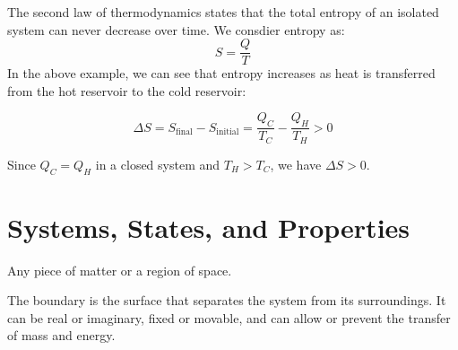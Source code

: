 \documentclass[11pt]{report}
\begin{document}
\begin{definition}
    The second law of thermodynamics states that the total entropy of an isolated system can never decrease over time. We consdier entropy as:
    \begin{equation}
        S = \frac{Q}{T}
    \end{equation}
    In the above example, we can see that entropy increases as heat is transferred from the hot reservoir to the cold reservoir:

    \begin{equation}
        \Delta S = S_{\text{final}} - S_{\text{initial}} = \frac{Q_C}{T_C} - \frac{Q_H}{T_H} > 0
    \end{equation}

    Since $Q_C = Q_H$ in a closed system and $T_H > T_C$, we have $\Delta S > 0$.
\end{definition}



\section{Systems, States, and Properties}
\begin{definition}[System]
    Any piece of matter or a region of space.
\end{definition}

\begin{definition}[Boundary]
    The boundary is the surface that separates the system from its surroundings. It can be real or imaginary, fixed or movable, and can allow or prevent the transfer of mass and energy.
\end{definition}
\end{document}
